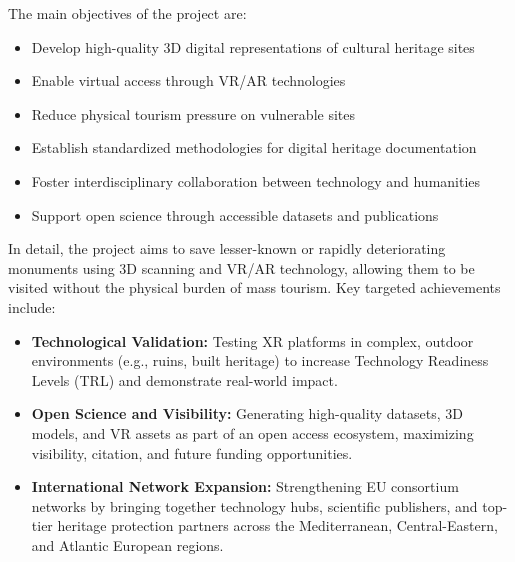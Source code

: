 \noindent
The main objectives of the project are:

\begin{itemize}
    \item Develop high-quality 3D digital representations of cultural heritage sites
    \item Enable virtual access through VR/AR technologies
    \item Reduce physical tourism pressure on vulnerable sites
    \item Establish standardized methodologies for digital heritage documentation
    \item Foster interdisciplinary collaboration between technology and humanities
    \item Support open science through accessible datasets and publications
\end{itemize}

\vspace{1em}
\noindent In detail, the project aims to save lesser-known or rapidly deteriorating monuments using 3D scanning and VR/AR technology, allowing them to be visited without the physical burden of mass tourism. Key targeted achievements include:
\begin{itemize}
    \item \textbf{Technological Validation:} Testing XR platforms in complex, outdoor environments (e.g., ruins, built heritage) to increase Technology Readiness Levels (TRL) and demonstrate real-world impact.
    \item \textbf{Open Science and Visibility:} Generating high-quality datasets, 3D models, and VR assets as part of an open access ecosystem, maximizing visibility, citation, and future funding opportunities.
    \item \textbf{International Network Expansion:} Strengthening EU consortium networks by bringing together technology hubs, scientific publishers, and top-tier heritage protection partners across the Mediterranean, Central-Eastern, and Atlantic European regions.
\end{itemize}